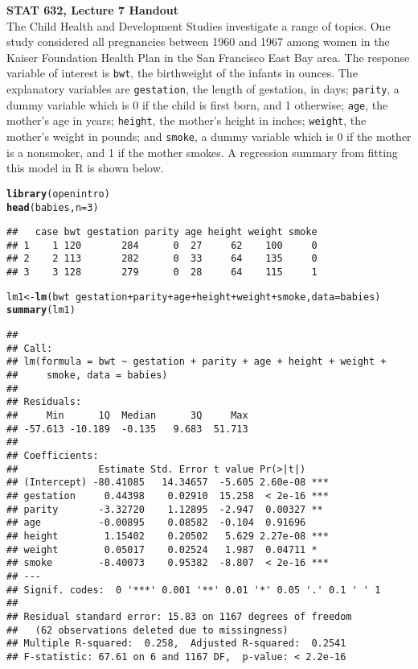 \documentclass[11pt, fleqn]{article}\usepackage[]{graphicx}\usepackage[]{color}
\makeatletter
\newcommand{\hlnum}[1]{\textcolor[rgb]{0.686,0.059,0.569}{#1}}%
\newcommand{\hlopt}[1]{\textcolor[rgb]{0,0,0}{#1}}%
\newcommand{\hlstd}[1]{\textcolor[rgb]{0.345,0.345,0.345}{#1}}%
\newcommand{\hlkwb}[1]{\textcolor[rgb]{0.69,0.353,0.396}{#1}}%
\newcommand{\hlkwc}[1]{\textcolor[rgb]{0.333,0.667,0.333}{#1}}%
\newcommand{\hlkwd}[1]{\textcolor[rgb]{0.737,0.353,0.396}{\textbf{#1}}}%
\newenvironment{kframe}{%
 \def\at@end@of@kframe{}%
 \ifinner\ifhmode%
  \def\at@end@of@kframe{\end{minipage}}%
  \begin{minipage}{\columnwidth}%
 \fi\fi%
 \def\FrameCommand##1{\hskip\@totalleftmargin \hskip-\fboxsep
 \colorbox{shadecolor}{##1}\hskip-\fboxsep
     \hskip-\linewidth \hskip-\@totalleftmargin \hskip\columnwidth}%
 \MakeFramed {\advance\hsize-\width
   \@totalleftmargin\z@ \linewidth\hsize
   \@setminipage}}%
 {\par\unskip\endMakeFramed%
 \at@end@of@kframe}
\newenvironment{knitrout}{}{} %
\makeatother
\begin{document}
\setlength\parindent{0pt}

\textbf{STAT 632, Lecture 7 Handout}\\

The Child Health and Development Studies investigate a range of topics. One study considered all pregnancies between 1960 and 1967 among women in the Kaiser Foundation Health Plan in the San Francisco East Bay area.  The response variable of interest is \texttt{bwt}, the birthweight of the infants in ounces.  The explanatory variables are \texttt{gestation}, the length of gestation, in days; \texttt{parity}, a dummy variable which is 0 if the child is first born, and 1 otherwise; \texttt{age}, the mother's age in years; \texttt{height}, the mother's height in inches; \texttt{weight}, the mother's weight in pounds; and \texttt{smoke}, a dummy variable which is 0 if the mother is a nonsmoker, and 1 if the mother smokes.  A regression summary from fitting this model in R is shown below.

\begin{knitrout}\small
{}\color{fgcolor}\begin{kframe}
\begin{alltt}
\hlkwd{library}\hlstd{(openintro)}
\hlkwd{head}\hlstd{(babies,} \hlkwc{n}\hlstd{=}\hlnum{3}\hlstd{)}
\end{alltt}
\begin{verbatim}
##   case bwt gestation parity age height weight smoke
## 1    1 120       284      0  27     62    100     0
## 2    2 113       282      0  33     64    135     0
## 3    3 128       279      0  28     64    115     1
\end{verbatim}
\begin{alltt}
\hlstd{lm1} \hlkwb{<-}  \hlkwd{lm}\hlstd{(bwt} \hlopt{~} \hlstd{gestation} \hlopt{+} \hlstd{parity} \hlopt{+} \hlstd{age} \hlopt{+} \hlstd{height} \hlopt{+} \hlstd{weight} \hlopt{+} \hlstd{smoke,} \hlkwc{data} \hlstd{= babies)}
\hlkwd{summary}\hlstd{(lm1)}
\end{alltt}
\begin{verbatim}
## 
## Call:
## lm(formula = bwt ~ gestation + parity + age + height + weight + 
##     smoke, data = babies)
## 
## Residuals:
##     Min      1Q  Median      3Q     Max 
## -57.613 -10.189  -0.135   9.683  51.713 
## 
## Coefficients:
##              Estimate Std. Error t value Pr(>|t|)    
## (Intercept) -80.41085   14.34657  -5.605 2.60e-08 ***
## gestation     0.44398    0.02910  15.258  < 2e-16 ***
## parity       -3.32720    1.12895  -2.947  0.00327 ** 
## age          -0.00895    0.08582  -0.104  0.91696    
## height        1.15402    0.20502   5.629 2.27e-08 ***
## weight        0.05017    0.02524   1.987  0.04711 *  
## smoke        -8.40073    0.95382  -8.807  < 2e-16 ***
## ---
## Signif. codes:  0 '***' 0.001 '**' 0.01 '*' 0.05 '.' 0.1 ' ' 1
## 
## Residual standard error: 15.83 on 1167 degrees of freedom
##   (62 observations deleted due to missingness)
## Multiple R-squared:  0.258,	Adjusted R-squared:  0.2541 
## F-statistic: 67.61 on 6 and 1167 DF,  p-value: < 2.2e-16
\end{verbatim}
\end{kframe}
\end{knitrout}
\clearpage
\end{document}
